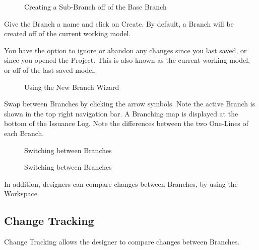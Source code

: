 \documentclass[letterpaper,10pt,english]{sphinxmanual}
\begin{document}
\begin{figure}[H]
\centering
\capstart

\noindent{}
\caption{Creating a Sub-Branch off of the Base Branch}\label{\detokenize{docs/userguide/projectmanagement/issuancelog/index-issuance_log:id2}}\end{figure}

Give the Branch a name and click on Create.  By default, a Branch will be created off of the current working model.

You have the option to ignore or abandon any changes since you last saved, or since you opened the Project.  This is also known as the current working model, or off of the last saved model.

\begin{figure}[H]
\centering
\capstart

\noindent{}
\caption{Using the New Branch Wizard}\label{\detokenize{docs/userguide/projectmanagement/issuancelog/index-issuance_log:id3}}\end{figure}

Swap between Branches by clicking the arrow symbols.  Note the active Branch is shown in the top right navigation bar.  A Branching map is displayed at the bottom of the Issuance Log.  Note the differences between the two One-Lines of each Branch.

\begin{figure}[H]
\centering
\capstart

\noindent{}
\caption{Switching between Branches}\label{\detokenize{docs/userguide/projectmanagement/issuancelog/index-issuance_log:id4}}\end{figure}

\begin{figure}[H]
\centering
\capstart

\noindent{}
\caption{Switching between Branches}\label{\detokenize{docs/userguide/projectmanagement/issuancelog/index-issuance_log:id5}}\end{figure}

In addition, designers can compare changes between Branches, by using the {\hyperref[\detokenize{docs/userguide/projectmanagement/changetracking/index-change_tracking:change-tracking}]{}} Workspace.


\subsection{Change Tracking}
\label{\detokenize{docs/userguide/projectmanagement/changetracking/index-change_tracking:change-tracking}}\label{\detokenize{docs/userguide/projectmanagement/changetracking/index-change_tracking:id1}}\label{\detokenize{docs/userguide/projectmanagement/changetracking/index-change_tracking::doc}}
Change Tracking allows the designer to compare changes between Branches.
\end{document}
